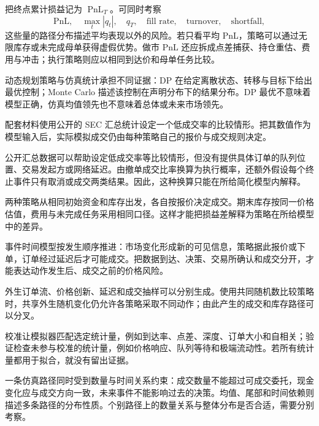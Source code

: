 
把终点累计损益记为 $\operatorname{PnL}_T$。可同时考察
\[
 \text{PnL},\quad \max_t|q_t|,\quad q_T,\quad
 \text{fill rate},\quad \text{turnover},\quad \text{shortfall},
\]
这些量的路径分布描述平均表现以外的风险。若只看平均 PnL，策略可以通过无限库存或未完成母单获得虚假优势。做市 PnL 还应拆成点差捕获、持仓重估、费用与冲击；执行策略则应以相同到达价和母单任务比较。

动态规划策略与仿真统计承担不同证据：DP 在给定离散状态、转移与目标下给出最优控制；Monte Carlo 描述该控制在声明分布下的结果分布。DP 最优不意味着模型正确，仿真均值领先也不意味着总体或未来市场领先。


配套材料使用公开的 SEC 汇总统计设定一个低成交率的比较情形。把其数值作为模型输入后，实际模拟成交仍由每种策略自己的报价与成交规则决定。

公开汇总数据可以帮助设定低成交率等比较情形，但没有提供具体订单的队列位置、交易发起方或网络延迟。由撤单成交比率换算为执行概率，还额外假设每个终止事件只有取消或成交两类结果。因此，这种换算只能在所给简化模型内解释。

两种策略从相同初始资金和库存出发，各自按报价决定成交。期末库存按同一价格估值，费用与未完成任务采用相同口径。这样才能把损益差解释为策略在所给模型中的差异\cite{hasbrouck2007empirical}。


事件时间模型按发生顺序推进：市场变化形成新的可见信息，策略据此报价或下单，订单经过延迟后才可能成交。把数据到达、决策、交易所确认和成交分开，才能表达动作发生后、成交之前的价格风险。

外生订单流、价格创新、延迟和成交抽样可以分别生成。使用共同随机数比较策略时，共享外生随机变化仍允许各策略采取不同动作；由此产生的成交和库存路径可以分叉。


校准让模拟器匹配选定统计量，例如到达率、点差、深度、订单大小和自相关；验证检查未参与校准的统计量，例如价格响应、队列等待和极端流动性。若所有统计量都用于拟合，就没有留出证据。

一条仿真路径同时受到数量与时间关系约束：成交数量不能超过可成交委托，现金变化应与成交方向一致，未来事件不能影响过去的决策。均值、尾部和时间依赖则描述多条路径的分布性质。个别路径上的数量关系与整体分布是否合适，需要分别考察。


